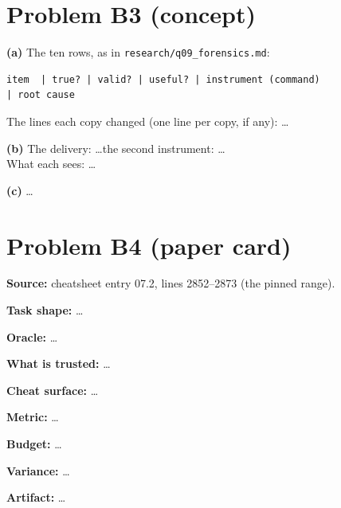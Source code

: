 \documentclass[11pt]{article}
\begin{document}
\section*{Problem B3 (concept)}\label{ans:B3}
\begin{answer}
\textbf{(a)} The ten rows, as in \texttt{research/q09\_forensics.md}:
\begin{lstlisting}[basicstyle=\ttfamily\scriptsize,breaklines=true,columns=fullflexible]
item  | true? | valid? | useful? | instrument (command)                    | root cause
\end{lstlisting}
The lines each copy changed (one line per copy, if any): \dots

\textbf{(b)} The delivery: \dots \quad the second instrument: \dots \\
What each sees: \dots

\textbf{(c)} \dots
\end{answer}

\section*{Problem B4 (paper card)}\label{ans:B4}
\begin{answer}
\textbf{Source:} cheatsheet entry 07.2, lines 2852--2873 (the pinned range).

\textbf{Task shape:} \dots

\textbf{Oracle:} \dots

\textbf{What is trusted:} \dots

\textbf{Cheat surface:} \dots

\textbf{Metric:} \dots

\textbf{Budget:} \dots

\textbf{Variance:} \dots

\textbf{Artifact:} \dots
\end{answer}
\end{document}
